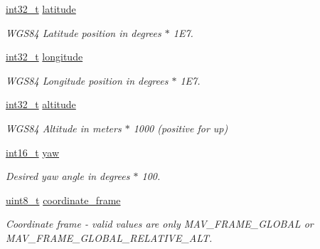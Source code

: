 \begin{DoxyCompactItemize}
\item 
\hyperlink{group___n_a_m_e_gafd12020da5a235dfcf0c3c748fb5baed}{int32\-\_\-t} \hyperlink{struct____mavlink__set__global__position__setpoint__int__t_a5ce6831e10b85d86c1641ab5e1e7793f}{latitude}
\begin{DoxyCompactList}\small\item\em W\-G\-S84 Latitude position in degrees $\ast$ 1\-E7. \end{DoxyCompactList}\item 
\hyperlink{group___n_a_m_e_gafd12020da5a235dfcf0c3c748fb5baed}{int32\-\_\-t} \hyperlink{struct____mavlink__set__global__position__setpoint__int__t_afe5579c39588820501f68c5114bf0902}{longitude}
\begin{DoxyCompactList}\small\item\em W\-G\-S84 Longitude position in degrees $\ast$ 1\-E7. \end{DoxyCompactList}\item 
\hyperlink{group___n_a_m_e_gafd12020da5a235dfcf0c3c748fb5baed}{int32\-\_\-t} \hyperlink{struct____mavlink__set__global__position__setpoint__int__t_a5b6969b11abbf7cb228976942d8417b9}{altitude}
\begin{DoxyCompactList}\small\item\em W\-G\-S84 Altitude in meters $\ast$ 1000 (positive for up) \end{DoxyCompactList}\item 
\hyperlink{stdint_8h_aa343fa3b3d06292b959ffdd4c4703b06}{int16\-\_\-t} \hyperlink{struct____mavlink__set__global__position__setpoint__int__t_add86bfbf2c48e2ce222feaf301e9f7a4}{yaw}
\begin{DoxyCompactList}\small\item\em Desired yaw angle in degrees $\ast$ 100. \end{DoxyCompactList}\item 
\hyperlink{stdint_8h_aba7bc1797add20fe3efdf37ced1182c5}{uint8\-\_\-t} \hyperlink{struct____mavlink__set__global__position__setpoint__int__t_a305c83285aa51ece52abfdf4e395b248}{coordinate\-\_\-frame}
\begin{DoxyCompactList}\small\item\em Coordinate frame -\/ valid values are only M\-A\-V\-\_\-\-F\-R\-A\-M\-E\-\_\-\-G\-L\-O\-B\-A\-L or M\-A\-V\-\_\-\-F\-R\-A\-M\-E\-\_\-\-G\-L\-O\-B\-A\-L\-\_\-\-R\-E\-L\-A\-T\-I\-V\-E\-\_\-\-A\-L\-T. \end{DoxyCompactList}\end{DoxyCompactItemize}


